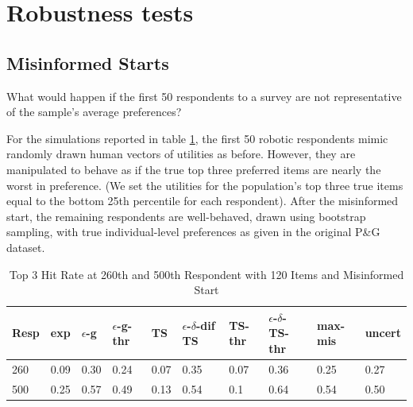 \documentclass[a4paper,11pt]{article}
\newcommand{\alexander}[1]{\textcolor{blue}{\textbf{(alexander)} #1}}
\newcommand{\eric}[1]{\textcolor{red}{\textbf{(eric)} #1}}
\newcommand{\fixedexpressS}{\textbf{exp}}
\newcommand{\egreedyS}{$\epsilon$-\textbf{g}}
\newcommand{\egreedythresS}{$\epsilon$-\textbf{g-thr}}
\newcommand{\misminS}{\textbf{max-mis}}
\newcommand{\tsS}{\textbf{TS} }
\newcommand{\edtsS}{$\epsilon$-$\delta$-\textbf{dif TS} }
\newcommand{\tsthresS}{\textbf{TS-thr} }
\newcommand{\edtsthresS}{$\epsilon$-$\delta$-\textbf{TS-thr} }
\newcommand{\uncertS}{\textbf{uncert} }
\begin{document}


\section{Robustness tests} \label{sec:robust}

\subsection{Misinformed Starts}


What would happen if the first 50 respondents to a survey are not representative of the sample's average preferences?

For the simulations reported in table \ref{table:120mis}, the first 50 robotic respondents mimic randomly drawn human vectors of utilities as before. However, they are manipulated to behave as if the true top three preferred items are nearly the worst in preference. (We set the utilities for the population's top three true items equal to the bottom 25th percentile for each respondent).  After the misinformed start, the remaining respondents are well-behaved, drawn using bootstrap sampling, with true individual-level preferences as given in the original P\&G dataset.

\begin{table}
\caption{Top 3 Hit Rate at 260th and 500th Respondent with 120 Items and Misinformed Start}
\begin{tabular}{llllllllll}
\hline   Resp &  \fixedexpressS&\egreedyS&\egreedythresS&\tsS&\edtsS&\tsthresS&\edtsthresS& \misminS& \uncertS   \\ \hline    260 &   0.09 &   0.30 & 0.24 & 0.07  & 0.35 & 0.07 &  0.36 & 0.25 &   0.27 \\
  500 &  0.25 &   0.57 &  0.49 &  0.13 & 0.54 &   0.1 &    0.64 & 0.54 &  0.50  \end{tabular}
\begin{center}
\label{table:120mis}
\end{center}
\end{table}
\end{document}
